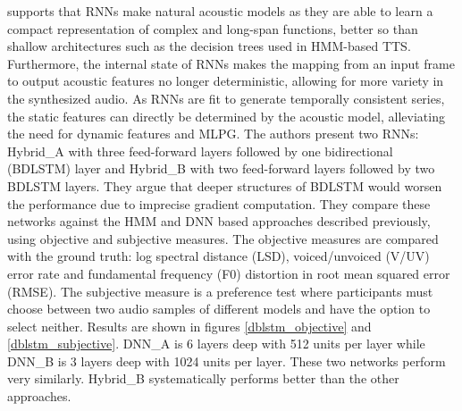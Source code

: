\documentclass[a4paper, oneside, 12pt, english]{article}
\begin{document}
\citep{BDLSTMTTS} supports that RNNs make natural acoustic models as they are able to learn a compact representation of complex and long-span functions, better so than shallow architectures such as the decision trees used in HMM-based TTS. Furthermore, the internal state of RNNs makes the mapping from an input frame to output acoustic features no longer deterministic, allowing for more variety in the synthesized audio. As RNNs are fit to generate temporally consistent series, the static features can directly be determined by the acoustic model, alleviating the need for dynamic features and MLPG. The authors present two RNNs: Hybrid\_A with three feed-forward layers followed by one bidirectional (BDLSTM) layer and Hybrid\_B with two feed-forward layers followed by two BDLSTM layers. They argue that deeper structures of BDLSTM would worsen the performance due to imprecise gradient computation. They compare these networks against the HMM and DNN based approaches described previously, using objective and subjective measures. The objective measures are compared with the ground truth: log spectral distance (LSD), voiced/unvoiced (V/UV) error rate and fundamental frequency (F0) distortion in root mean squared error (RMSE). The subjective measure is a preference test where participants must choose between two audio samples of different models and have the option to select neither. Results are shown in figures \ref{dblstm_objective} and \ref{dblstm_subjective}. DNN\_A is 6 layers deep with 512 units per layer while DNN\_B is 3 layers deep with 1024 units per layer. These two networks perform very similarly. Hybrid\_B systematically performs better than the other approaches.

\end{document}
